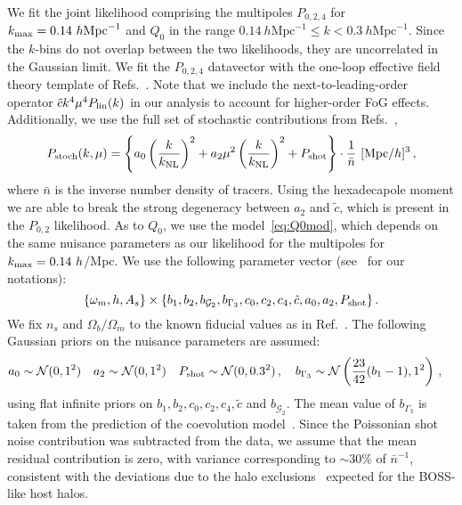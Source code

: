\documentclass[12pt,a4paper]{article}
\newcommand{\be}{\begin{equation}}
\newcommand{\ee}{\end{equation}}
\newcommand\hMpc{h\text{Mpc}^{-1}}
\begin{document}
We fit the joint likelihood comprising 
the multipoles $P_{0,2,4}$ for $k_{\rm max}=0.14~\hMpc$ 
and $Q_0$ in the range $0.14~\hMpc\leq k<0.3~\hMpc$. 
Since the $k$-bins do not overlap between the two likelihoods, 
they are uncorrelated in the Gaussian limit. We fit the $P_{0,2,4}$ datavector with the
one-loop effective field theory template of Refs.~\cite{Perko:2016puo,Nishimichi:2020tvu,Ivanov:2019pdj,Chudaykin:2020aoj}. Note that we include the next-to-leading-order operator $\tilde c k^4 \mu^4 P_{\rm lin}(k)$ in our analysis to account for higher-order FoG effects. Additionally, we use
the full set of
stochastic contributions from Refs.~\cite{Perko:2016puo,Schmittfull:2020trd},
\be
\label{eq:stochdef}
P_{\rm stoch}(k,\mu)= \left\{a_0 \left(\frac{k}{k_{\rm NL}}\right)^2 + a_2 \mu^2 \left(\frac{k}{k_{\rm NL}}\right)^2 + P_{\rm shot}\right\}\cdot \frac{1}{\bar n}~[\text{Mpc}/h]^3\,,
\ee 
where $\bar n$ is the inverse number density of tracers.
Using the hexadecapole moment we are able to break the 
strong degeneracy between $a_2$ and $\tilde c$, which is present 
in the $P_{0,2}$ likelihood. As to $Q_0$, we use the model~\eqref{eq:Q0mod}, which depends on the same nuisance parameters 
as our likelihood for the multipoles for $k_{\rm max}=0.14~h$/Mpc. We use the following parameter vector (see~\cite{Chudaykin:2020aoj} for our notations):
\be
\{\omega_m,h,A_s\}\times 
\{b_1,b_2,b_{\mathcal{G}_2},b_{\Gamma_3},c_0,c_2,c_4,\tilde{c},a_0,a_2,P_{\rm shot} \} \,.
\ee
We fix $n_s$ and $\Omega_b/\Omega_m$ to the known fiducial values
as in Ref.~\cite{Nishimichi:2020tvu}. The following Gaussian priors on the nuisance parameters are assumed:
\be
\begin{split}
& a_0 \sim \mathcal{N}(0,1^2)\quad a_2\sim \mathcal{N}(0,1^2)\quad P_{\rm shot}\sim \mathcal{N}(0,0.3^2)\,,\quad b_{\Gamma_3}\sim \mathcal{N}
\left(\frac{23}{42}(b_1-1), 1^2\right)\,, 
\end{split} 
\ee
using flat infinite priors on $b_1, b_2, c_0, c_2, c_4,\tilde{c}$ and $b_{\mathcal{G}_2}$.
The mean value of $b_{\Gamma_3}$ is taken from the prediction of the coevolution model~\cite{Desjacques:2016bnm,Abidi:2018eyd}.
Since the Poissonian shot noise contribution was subtracted from the data, we assume that the 
mean residual contribution is zero, with variance corresponding to $\sim 30\%$ of $\bar{n}^{-1}$,
consistent with the deviations due to the halo exclusions~\cite{Baldauf:2013hka,Schmittfull:2018yuk} 
expected for the BOSS-like host halos.
\end{document}
